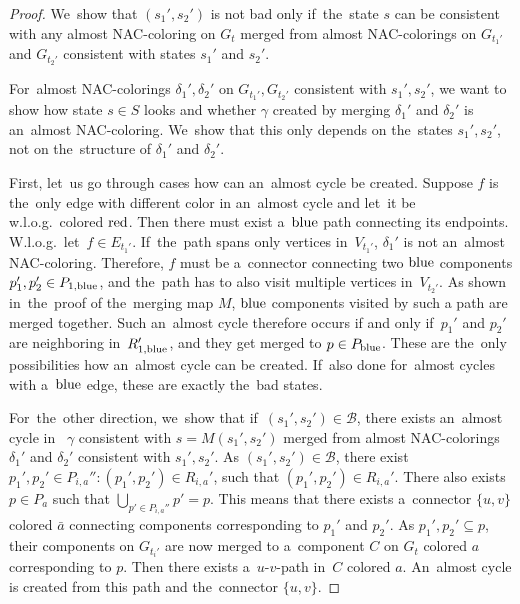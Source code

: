 \begin{proof}
	We~show that \( (s_1', s_2') \) is not bad only if~the~state \( s \)
	can be consistent with any almost NAC-coloring on \( G_t \)
	merged from almost NAC-colorings on \( G_{t_1'} \) and \( G_{t_2'} \)
	consistent with states \( s_1' \) and \( s_2' \).

	For~almost NAC-colorings \( \delta_1', \delta_2' \) on \( G_{t_1'}, G_{t_2'} \)
	consistent with \( s_1', s_2' \),
	we want to show how state \( s \in S \) looks and
	whether \rbcol{} \( \gamma \) created by merging \( \delta_1' \) and \( \delta_2' \)
	is an~almost NAC-coloring.
	We~show that this only depends on the~states \( s_1', s_2' \),
	not on the~structure of \( \delta_1' \) and \( \delta_2' \).

	First, let~us go through cases how can an~almost cycle be created.
	Suppose \( f \) is the~only edge with different color
	in an~almost cycle and let~it be w.l.o.g.\ colored \( \text{red} \).
	Then there must exist a~\( \text{blue} \) path connecting its endpoints.
	W.l.o.g.\ let~\( f \in E_{t_1'} \).
	If~the~path spans only vertices
	in~\( V_{t_1'} \), \( \delta_1' \) is not an~almost NAC-coloring.
	Therefore, \( f \) must be
	a~connector connecting two \( \text{blue} \) components \( p_1', p_2' \in P_{1,\text{blue}} \),
	and the~path has to also visit multiple vertices in~\( V_{t_2'} \).
	As shown in~the~proof of the~merging map \( M \), \( \text{blue} \) components
	visited by such a path are merged together.
	Such an~almost cycle therefore occurs
	if and only if~\( p_1' \) and \( p_2' \) are neighboring in~\( R_{1,\text{blue}}' \),
	and they get merged to \( p \in P_{\text{blue}} \).
	These are the~only possibilities how an~almost cycle can be created.
	If~also done for~almost cycles with a~\( \text{blue} \) edge,
	these are exactly the~bad states.

	For~the~other direction, we~show that if~\( (s_1', s_2') \in \mathcal{B} \),
	there exists an~almost cycle
	in~\rbcol{} \( \gamma \) consistent with \( s = M(s_1', s_2') \)
	merged from almost NAC-colorings \( \delta_1' \) and \( \delta_2' \)
	consistent with \( s_1', s_2' \).
	As \( (s_1', s_2') \in \mathcal{B} \),
	there exist \( p_1', p_2' \in P_{i, a}'' : (p_1', p_2') \in R_{i, a}' \),
	such that \( (p_1', p_2') \in R_{i, a}' \).
	There also exists \( p \in P_{a} \) such that \( \bigcup_{p' \in P_{i, a}''} p' = p \).
	This means that there exists a~connector \( \{u, v\} \) colored \( \bar{a} \) connecting
	components corresponding to \( p_1' \) and \( p_2' \).
	As \( p_1', p_2' \subseteq p \),
	their components on \( G_{t_i'} \) are now merged
	to a~component \( C \) on \( G_t \) colored \( a \) corresponding to \( p \).
	Then there exists a~\( u \)-\( v \)-path in~\( C \) colored \( a \).
	An~almost cycle is created from this path and the~connector \( \{u, v\} \).
\end{proof}
%

